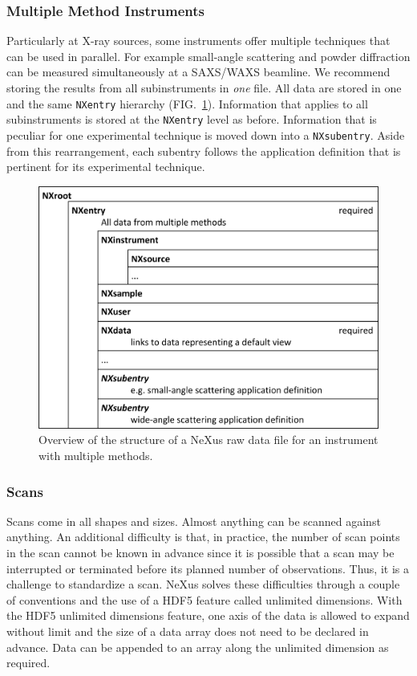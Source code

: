 \documentclass[%
 aip,
rsi,
 amsmath,amssymb,
 reprint,%
]{revtex4-1}
\begin{document}
\subsubsection{Multiple Method Instruments}

Particularly at X-ray sources,
some instruments offer multiple techniques that can be used in parallel.
For example small-angle scattering and powder diffraction 
can be measured simultaneously at a SAXS/WAXS beamline.
We recommend storing the results from all subinstruments in \emph{one} file.
All data are stored in one and the same \texttt{NXentry} hierarchy
(FIG.~\ref{multimethod}).
Information that applies to all subinstruments is stored
at the \texttt{NXentry} level as before.
Information that is peculiar for one experimental technique
is moved down into a \texttt{NXsubentry}.
Aside from this rearrangement,
each subentry follows the application definition that is pertinent
for its experimental technique.

\begin{figure}
\includegraphics[width=\columnwidth]{figure2}
\caption{\label{multimethod}Overview of the structure of a NeXus raw data file for an instrument with multiple methods.}
\end{figure}

\subsubsection{Scans}

Scans come in all shapes and sizes. Almost anything can be scanned against anything. 
An additional difficulty is that, in practice, the number of scan points in the scan 
cannot be known in advance since it is possible that a scan may be interrupted or terminated
before its planned number of observations. 
Thus, it is a challenge to standardize a scan.
NeXus solves these difficulties through 
a couple of conventions and the use of a HDF5 feature called unlimited dimensions. With the HDF5 
unlimited dimensions feature, one axis of the data is allowed to expand without limit and 
the size of a data array does not need to be declared in advance. Data can be appended 
to an array along the unlimited dimension as required. 
\end{document}
